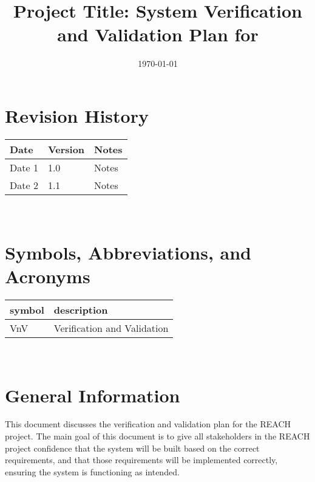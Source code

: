 \documentclass[12pt, titlepage]{article}
\begin{document}
\title{Project Title: System Verification and Validation Plan for \progname{}} 
\author{\authname}
\date{\today}
	
\maketitle


\section*{Revision History}

\begin{tabularx}{\textwidth}{p{3cm}p{2cm}X}
\toprule {\bf Date} & {\bf Version} & {\bf Notes}\\
\midrule
Date 1 & 1.0 & Notes\\
Date 2 & 1.1 & Notes\\
\bottomrule
\end{tabularx}

~\\

\newpage

\tableofcontents

\listoftables

\newpage

\section{Symbols, Abbreviations, and Acronyms}

\renewcommand{\arraystretch}{1.2}
\begin{tabular}{l l} 
  \toprule		
  \textbf{symbol} & \textbf{description}\\
  \midrule 
  VnV & Verification and Validation\\
  \bottomrule
\end{tabular}\\

\newpage


\section{General Information}

This document discusses the verification and validation plan for the REACH project. The main goal of this document
is to give all stakeholders in the REACH project confidence that the system will be built based on the correct 
requirements, and that those requirements will be implemented correctly, ensuring the system is functioning as intended.
\end{document}
